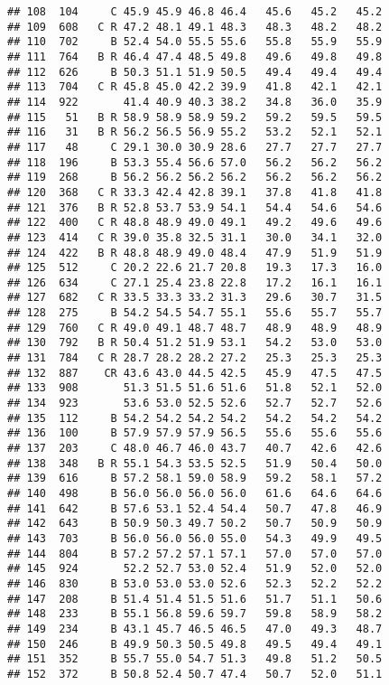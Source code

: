 \documentclass[]{article}
\begin{document}
\begin{verbatim}
## 108  104     C 45.9 45.9 46.8 46.4   45.6   45.2   45.2
## 109  608   C R 47.2 48.1 49.1 48.3   48.3   48.2   48.2
## 110  702     B 52.4 54.0 55.5 55.6   55.8   55.9   55.9
## 111  764   B R 46.4 47.4 48.5 49.8   49.6   49.8   49.8
## 112  626     B 50.3 51.1 51.9 50.5   49.4   49.4   49.4
## 113  704   C R 45.8 45.0 42.2 39.9   41.8   42.1   42.1
## 114  922       41.4 40.9 40.3 38.2   34.8   36.0   35.9
## 115   51   B R 58.9 58.9 58.9 59.2   59.2   59.5   59.5
## 116   31   B R 56.2 56.5 56.9 55.2   53.2   52.1   52.1
## 117   48     C 29.1 30.0 30.9 28.6   27.7   27.7   27.7
## 118  196     B 53.3 55.4 56.6 57.0   56.2   56.2   56.2
## 119  268     B 56.2 56.2 56.2 56.2   56.2   56.2   56.2
## 120  368   C R 33.3 42.4 42.8 39.1   37.8   41.8   41.8
## 121  376   B R 52.8 53.7 53.9 54.1   54.4   54.6   54.6
## 122  400   C R 48.8 48.9 49.0 49.1   49.2   49.6   49.6
## 123  414   C R 39.0 35.8 32.5 31.1   30.0   34.1   32.0
## 124  422   B R 48.8 48.9 49.0 48.4   47.9   51.9   51.9
## 125  512     C 20.2 22.6 21.7 20.8   19.3   17.3   16.0
## 126  634     C 27.1 25.4 23.8 22.8   17.2   16.1   16.1
## 127  682   C R 33.5 33.3 33.2 31.3   29.6   30.7   31.5
## 128  275     B 54.2 54.5 54.7 55.1   55.6   55.7   55.7
## 129  760   C R 49.0 49.1 48.7 48.7   48.9   48.9   48.9
## 130  792   B R 50.4 51.2 51.9 53.1   54.2   53.0   53.0
## 131  784   C R 28.7 28.2 28.2 27.2   25.3   25.3   25.3
## 132  887    CR 43.6 43.0 44.5 42.5   45.9   47.5   47.5
## 133  908       51.3 51.5 51.6 51.6   51.8   52.1   52.0
## 134  923       53.6 53.0 52.5 52.6   52.7   52.7   52.6
## 135  112     B 54.2 54.2 54.2 54.2   54.2   54.2   54.2
## 136  100     B 57.9 57.9 57.9 56.5   55.6   55.6   55.6
## 137  203     C 48.0 46.7 46.0 43.7   40.7   42.6   42.6
## 138  348   B R 55.1 54.3 53.5 52.5   51.9   50.4   50.0
## 139  616     B 57.2 58.1 59.0 58.9   59.2   58.1   57.2
## 140  498     B 56.0 56.0 56.0 56.0   61.6   64.6   64.6
## 141  642     B 57.6 53.1 52.4 54.4   50.7   47.8   46.9
## 142  643     B 50.9 50.3 49.7 50.2   50.7   50.9   50.9
## 143  703     B 56.0 56.0 56.0 55.0   54.3   49.9   49.5
## 144  804     B 57.2 57.2 57.1 57.1   57.0   57.0   57.0
## 145  924       52.2 52.7 53.0 52.4   51.9   52.0   52.0
## 146  830     B 53.0 53.0 53.0 52.6   52.3   52.2   52.2
## 147  208     B 51.4 51.4 51.5 51.6   51.7   51.1   50.6
## 148  233     B 55.1 56.8 59.6 59.7   59.8   58.9   58.2
## 149  234     B 43.1 45.7 46.5 46.5   47.0   49.3   48.7
## 150  246     B 49.9 50.3 50.5 49.8   49.5   49.4   49.1
## 151  352     B 55.7 55.0 54.7 51.3   49.8   51.2   50.5
## 152  372     B 50.8 52.4 50.7 47.4   50.7   52.0   51.1

\end{verbatim}
\end{document}
